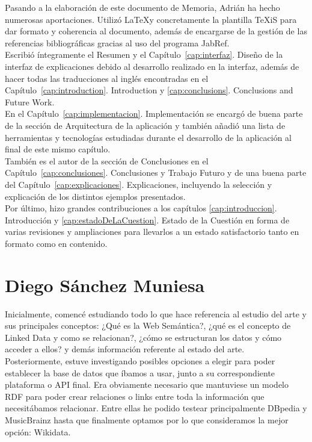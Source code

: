 Pasando a la elaboración de este documento de Memoria, Adrián ha hecho numerosas aportaciones. Utilizó \LaTeX y concretamente la plantilla TeXiS para dar formato y coherencia al documento, además de encargarse de la gestión de las referencias bibliográficas gracias al uso del programa JabRef. \\

Escribió íntegramente el Resumen y el Capítulo~\ref{cap:interfaz}. Diseño de la interfaz de explicaciones debido al desarrollo realizado en la interfaz, además de hacer todas las traducciones al inglés encontradas en el Capítulo~\ref{cap:introduction}. Introduction y \ref{cap:conclusions}. Conclusions and Future Work. \\


En el Capítulo~\ref{cap:implementacion}. Implementación se encargó de buena parte de la sección de Arquitectura de la aplicación y  también añadió una lista de herramientas y tecnologías estudiadas durante el desarrollo de la aplicación al final de este mismo capítulo. \\

También es el autor de la sección de Conclusiones en el Capítulo~\ref{cap:conclusiones}. Conclusiones y Trabajo Futuro y de una buena parte del Capítulo~\ref{cap:explicaciones}. Explicaciones, incluyendo la selección y explicación de los distintos ejemplos presentados. \\

Por último, hizo grandes contribuciones a los capítulos \ref{cap:introduccion}. Introducción y \ref{cap:estadoDeLaCuestion}. Estado de la Cuestión en forma de varias revisiones y ampliaciones para llevarlos a un estado satisfactorio tanto en formato como en contenido. \\


\section{Diego Sánchez Muniesa}

Inicialmente, comencé estudiando todo lo que hace referencia al estudio del arte y sus principales conceptos: ¿Qué es la Web Semántica?, ¿qué es el concepto de Linked Data y como se relacionan?, ¿cómo se estructuran los datos y cómo acceder a ellos? y demás información referente al estado del arte.\\

Posteriormente, estuve investigando posibles opciones a elegir para poder establecer la base de datos que íbamos a usar, junto a su correspondiente plataforma o API final. Era obviamente necesario que mantuviese un modelo RDF para poder crear relaciones o links entre toda la información que necesitábamos relacionar. Entre ellas he podido testear principalmente DBpedia y MusicBrainz hasta que finalmente optamos por lo que consideramos la mejor opción: Wikidata.\\


